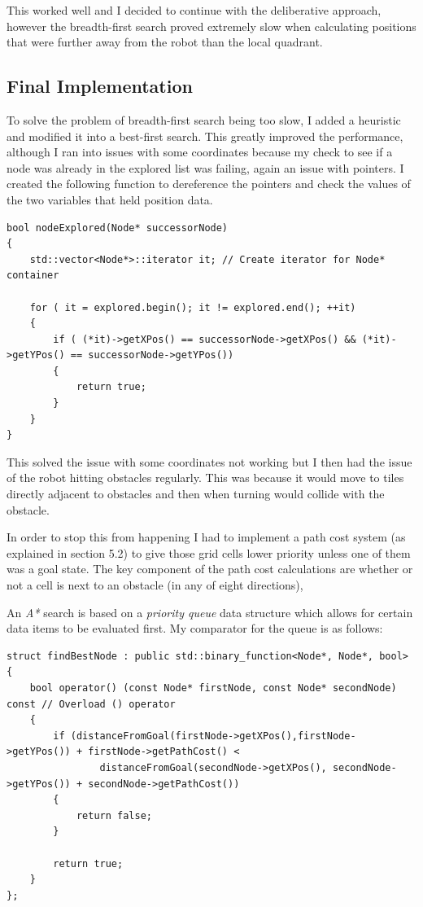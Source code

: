 \documentclass[a4paper,12pt]{article}
\begin{document}
This worked well and I decided to continue with the deliberative approach, however the breadth-first search proved extremely slow when calculating positions that were further away from the robot than the local quadrant.
\subsection{Final Implementation}
To solve the problem of breadth-first search being too slow, I added a heuristic and modified it into a best-first search. This greatly improved the performance, although I ran into issues with some coordinates because my check to see if a node was already in the explored list was failing, again an issue with pointers. I created the following function to dereference the pointers and check the values of the two variables that held position data.

\begin{lstlisting}
bool nodeExplored(Node* successorNode)
{
    std::vector<Node*>::iterator it; // Create iterator for Node* container 

    for ( it = explored.begin(); it != explored.end(); ++it)
    {
        if ( (*it)->getXPos() == successorNode->getXPos() && (*it)->getYPos() == successorNode->getYPos())
        {
            return true;
        }
    }
}
\end{lstlisting}

This solved the issue with some coordinates not working but I then had the issue of the robot hitting obstacles regularly. This was because it would move to tiles directly adjacent to obstacles and then when turning would collide with the obstacle. 

In order to stop this from happening I had to implement a path cost system (as explained in section 5.2) to give those grid cells lower priority unless one of them was a goal state. The key component of the path cost calculations are whether or not a cell is next to an obstacle (in any of eight directions),

An \textit{A*} search is based on a \textit{priority queue} data structure which allows for certain data items to be evaluated first. My comparator for the queue is as follows:

\begin{lstlisting}
struct findBestNode : public std::binary_function<Node*, Node*, bool>
{
    bool operator() (const Node* firstNode, const Node* secondNode) const // Overload () operator
    {
        if (distanceFromGoal(firstNode->getXPos(),firstNode->getYPos()) + firstNode->getPathCost() < 
                distanceFromGoal(secondNode->getXPos(), secondNode->getYPos()) + secondNode->getPathCost())
        {
            return false;
        }

        return true;
    }
};
\end{lstlisting}
\end{document}
